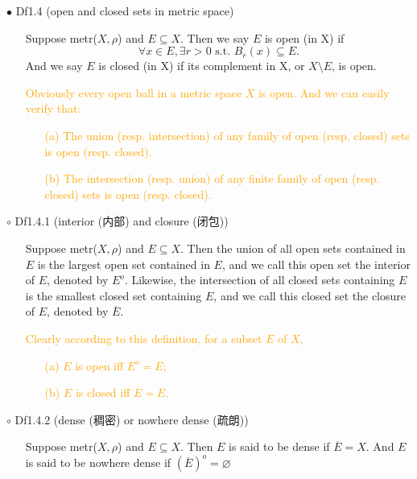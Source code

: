 \documentclass{article}
\begin{document}
{\Large $\bullet $ Df1.4 (open and closed sets in metric space)}\par
\begin{itemize}
    \item[]
    {\large Suppose metr($X, \rho$) and $E\subseteq X$. Then we say $E$ is open (in X) if
    $$\forall x\in E, \exists r>0 \text{ s.t. } B_r(x)\subseteq E. $$
    And we say $E$ is closed (in X) if its complement in X, or $X\setminus E$, is open.}  
    {\textcolor{orange}{Obviously every open ball in a metric space $X$ is open. And we can easily verify that:
    \begin{enumerate}
        \item[(a)] The union (resp. intersection) of any family of open (resp. closed) sets is open (resp. closed).
        \item[(b)] The intersection (resp. union) of any finite family of open (resp. closed) sets is open (resp. closed).
    \end{enumerate}}}
\end{itemize}\par
\quad

{\Large $\circ $ Df1.4.1 (interior (内部) and closure (闭包))}\par
\begin{itemize}
    \item[]
    {\large Suppose metr($X, \rho$) and $E\subseteq X$. 
    Then the union of all open sets contained in $E$ is the largest open set contained in $E$, 
    and we call this open set the interior of $E$, denoted by $E^o $.
    Likewise, the intersection of all closed sets containing $E$ is the smallest closed set containing $E$,
    and we call this closed set the closure of $E$, denoted by $\overline{E} $.}\par
    \textcolor{orange}{Clearly according to this definition, for a subset $E$ of $X$,  
    \begin{enumerate}
        \item[(a)] $E$ is open iff $E^o = E$;
        \item[(b)] $E$ is closed iff $\overline{E} = E$. 
    \end{enumerate}}
\end{itemize}\par
\quad

{\Large $\circ $ Df1.4.2 (dense (稠密) or nowhere dense (疏朗))}\par
\begin{itemize}
    \item[]
    {\large Suppose metr($X, \rho$) and $E\subseteq X$. 
    Then $E$ is said to be dense if $\overline{E}=X$. And $E$ is said to be nowhere dense if $(\overline{E})^o=\varnothing$}
\end{itemize}\par
\quad
\end{document}
